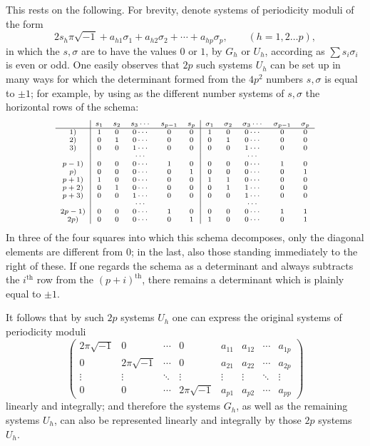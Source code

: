 \documentclass[10pt]{article}
\begin{document}
This rests on the following. For brevity, denote systems of periodicity moduli of the form
\[
2s_h\pi\sqrt{-1}+a_{h1}\sigma_1+a_{h2}\sigma_2+\cdots+a_{hp}\sigma_p,
\qquad (h=1,2\ldots p),
\]
in which the \(s,\sigma\) are to have the values \(0\) or \(1\), by \(G_h\) or \(U_h\), according as \(\sum s_i\sigma_i\) is even or odd. One easily observes that \(2p\) such systems \(U_h\) can be set up in many ways for which the determinant formed from the \(4p^2\) numbers \(s,\sigma\) is equal to \(\pm1\); for example, by using as the different number systems of \(s,\sigma\) the horizontal rows of the schema:
\[
\scriptsize
\begin{array}{c|ccccc|ccccc}
& s_1&s_2&s_3\cdots&s_{p-1}&s_p
& \sigma_1&\sigma_2&\sigma_3\cdots&\sigma_{p-1}&\sigma_p\\ \hline
1)   &1&0&0\cdots&0&0&1&0&0\cdots&0&0\\
2)   &0&1&0\cdots&0&0&0&1&0\cdots&0&0\\
3)   &0&0&1\cdots&0&0&0&0&1\cdots&0&0\\
     & & &\cdots& & & & &\cdots& &\\
p-1) &0&0&0\cdots&1&0&0&0&0\cdots&1&0\\
p)   &0&0&0\cdots&0&1&0&0&0\cdots&0&1\\
p+1) &1&0&0\cdots&0&0&1&1&0\cdots&0&0\\
p+2) &0&1&0\cdots&0&0&0&1&1\cdots&0&0\\
p+3) &0&0&1\cdots&0&0&0&0&1\cdots&0&0\\
     & & &\cdots& & & & &\cdots& &\\
2p-1)&0&0&0\cdots&1&0&0&0&0\cdots&1&1\\
2p)  &0&0&0\cdots&0&1&1&0&0\cdots&0&1
\end{array}
\]
In three of the four squares into which this schema decomposes, only the diagonal elements are different from \(0\); in the last, also those standing immediately to the right of these. If one regards the schema as a determinant and always subtracts the \(i^{\text{th}}\) row from the \((p+i)^{\text{th}}\), there remains a determinant which is plainly equal to \(\pm1\).

It follows that by such \(2p\) systems \(U_h\) one can express the original systems of periodicity moduli
\[
\left(
\begin{array}{cccc|cccc}
2\pi\sqrt{-1}&0&\cdots&0&a_{11}&a_{12}&\cdots&a_{1p}\\
0&2\pi\sqrt{-1}&\cdots&0&a_{21}&a_{22}&\cdots&a_{2p}\\
\vdots&\vdots&\ddots&\vdots&\vdots&\vdots&\ddots&\vdots\\
0&0&\cdots&2\pi\sqrt{-1}&a_{p1}&a_{p2}&\cdots&a_{pp}
\end{array}
\right)
\]
linearly and integrally; and therefore the systems \(G_h\), as well as the remaining systems \(U_h\), can also be represented linearly and integrally by those \(2p\) systems \(U_h\).
\end{document}
